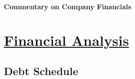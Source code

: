 \documentclass{article}
\begin{document}
\textbf{Commentary on Company Financials}

\begin{tcolorbox}[colback=white]
\end{tcolorbox}

\section*{\underline{Financial Analysis}}

\subsection*{Debt Schedule}
\end{document}
